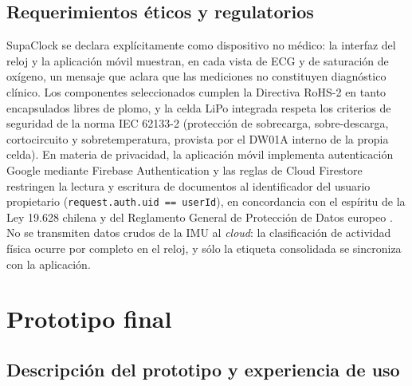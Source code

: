 \documentclass[letterpaper,11pt]{article}
\begin{document}
\subsection{Requerimientos \'eticos y regulatorios}

SupaClock se declara expl\'icitamente como dispositivo no m\'edico: la interfaz del reloj y la aplicaci\'on m\'ovil muestran, en cada vista de ECG y de saturaci\'on de ox\'igeno, un mensaje que aclara que las mediciones no constituyen diagn\'ostico cl\'inico. Los componentes seleccionados cumplen la Directiva RoHS-2 \cite{rohs} en tanto encapsulados libres de plomo, y la celda LiPo integrada respeta los criterios de seguridad de la norma IEC 62133-2 \cite{en62133} (protecci\'on de sobrecarga, sobre-descarga, cortocircuito y sobretemperatura, provista por el DW01A \cite{dw01a_ds} interno de la propia celda). En materia de privacidad, la aplicaci\'on m\'ovil implementa autenticaci\'on Google mediante Firebase Authentication \cite{firebase_docs} y las reglas de Cloud Firestore restringen la lectura y escritura de documentos al identificador del usuario propietario (\texttt{request.auth.uid == userId}), en concordancia con el esp\'iritu de la Ley 19.628 chilena \cite{ley19628} y del Reglamento General de Protecci\'on de Datos europeo \cite{gdpr}. No se transmiten datos crudos de la IMU al \textit{cloud}: la clasificaci\'on de actividad f\'isica ocurre por completo en el reloj, y s\'olo la etiqueta consolidada se sincroniza con la aplicaci\'on.

\newpage

\section{Prototipo final}\label{sec:prototipo}

\subsection{Descripci\'on del prototipo y experiencia de uso}\label{sec:proto_desc}
\end{document}
